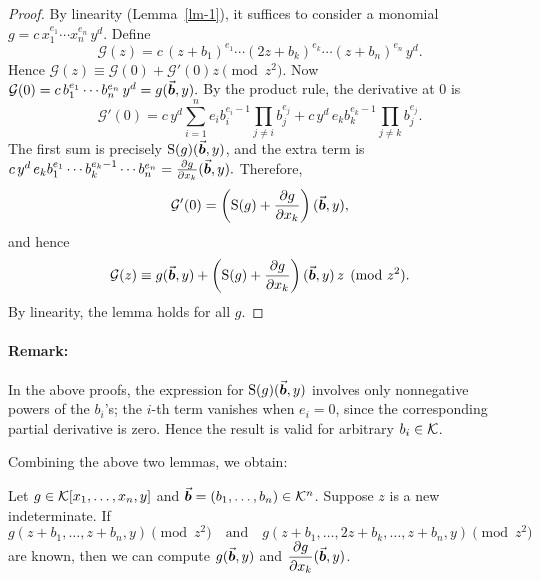 \documentclass{article}
\numberwithin{equation}{section}
\begin{document}
\begin{proof}
By linearity (Lemma~\ref{lm-1}), it suffices to consider a monomial
$g=c\,x_1^{e_1}\cdots x_n^{e_n}\,y^d$. Define
\[
\mathcal{G}(z)=c\,(z+b_1)^{e_1}\cdots (2z+b_k)^{e_k}\cdots (z+b_n)^{e_n}\,y^d.
\]
Hence
%
$\mathcal{G}(z)\equiv \mathcal{G}(0)+\mathcal{G}'(0)z \pmod{z^2}.$
%
Now
%
$\mathcal{G}(0)=c\,b_1^{e_1}\cdots b_n^{e_n}\,y^d=g(\vec{\boldsymbol{b}},y).$
%
By the product rule, the derivative at $0$ is
\[
\mathcal{G}'(0)=c\,y^d\sum_{i=1}^n e_i b_i^{e_i-1}\prod_{j\ne i} b_j^{e_j}
+ c\,y^d\, e_k b_k^{e_k-1}\prod_{j\ne k} b_j^{e_j}.
\]
The first sum is precisely $\mathrm S(g)(\vec{\boldsymbol{b}},y)$, and the extra term is
%
$c\,y^d\, e_k b_1^{e_1}\cdots b_k^{e_k-1}\cdots b_n^{e_n}
= \frac{\partial g}{\partial x_k}(\vec{\boldsymbol{b}},y).$
%
Therefore,
\[
\mathcal{G}'(0)=\left(\mathrm S(g)+\frac{\partial g}{\partial x_k}\right)(\vec{\boldsymbol{b}},y),
\]
and hence
\[
\mathcal{G}(z)\equiv g(\vec{\boldsymbol{b}},y)+\left(\mathrm S(g)+\frac{\partial g}{\partial x_k}\right)(\vec{\boldsymbol{b}},y)\,z \pmod{z^2}.
\]
By linearity, the lemma holds for all $g$.
\end{proof}

\paragraph{Remark:} 
In the above proofs, the expression for $\mathrm S(g)(\vec{\boldsymbol{b}},y)$ involves only nonnegative powers of the $b_i$'s; the $i$-th term vanishes when $e_i = 0$, since the corresponding partial derivative is zero. Hence the result is valid for arbitrary $b_i \in {\mathcal{K}}$.


Combining the above two lemmas, we obtain:
\begin{lemma}
Let $g\in {\mathcal{K}}[x_1,\dots,x_n,y]$ and $\vec{\boldsymbol{b}}=(b_1,\dots,b_n)\in {\mathcal{K}}^{n}$. Suppose $z$ is a new indeterminate. If
\[
g(z+b_1,\dots,z+b_n,y) \pmod{z^2} \quad\text{and}\quad g(z+b_1,\dots,2z+b_k,\dots,z+b_n,y) \pmod{z^2}
\]
are known, then we can compute $g(\vec{\boldsymbol{b}},y)$ and $\dfrac{\partial g}{\partial x_k}(\vec{\boldsymbol{b}},y)$.
\end{lemma}
\end{document}
